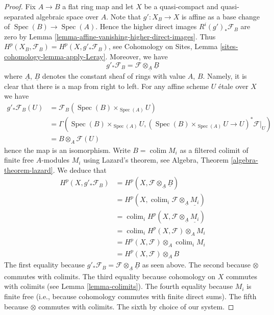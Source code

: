 \documentclass{stacks-project}
\theoremstyle{plain}
\theoremstyle{definition}
\theoremstyle{remark}
\numberwithin{equation}{subsection}
\def\colim{\mathop{\mathrm{colim}}\nolimits}
\def\Spec{\mathop{\mathrm{Spec}}}
\begin{document}
\begin{proof}
\medskip\noindent
Fix $A \to B$ a flat ring map and let $X$ be a quasi-compact and
quasi-separated algebraic space over $A$. Note that $g' : X_B \to X$
is affine as a base change of $\Spec(B) \to \Spec(A)$. Hence
the higher direct images $R^i(g')_*\mathcal{F}_B$ are zero by
Lemma \ref{lemma-affine-vanishing-higher-direct-images}.
Thus $H^p(X_B, \mathcal{F}_B) = H^p(X, g'_*\mathcal{F}_B)$, see
Cohomology on Sites, Lemma \ref{sites-cohomology-lemma-apply-Leray}.
Moreover, we have
$$
g'_*\mathcal{F}_B = \mathcal{F} \otimes_{\underline{A}} \underline{B}
$$
where $\underline{A}$, $\underline{B}$ denotes the constant sheaf of
rings with value $A$, $B$. Namely, it is clear that there is a map
from right to left. For any affine scheme $U$ \'etale over $X$ we have
\begin{align*}
g'_*\mathcal{F}_B(U) & = \mathcal{F}_B(\Spec(B) \times_{\Spec(A)} U) \\
& =
\Gamma(\Spec(B) \times_{\Spec(A)} U,
(\Spec(B) \times_{\Spec(A)} U \to U)^*\mathcal{F}|_U) \\
& =
B \otimes_A \mathcal{F}(U)
\end{align*}
hence the map is an isomorphism. Write $B = \colim M_i$ as a filtered
colimit of finite free $A$-modules $M_i$ using Lazard's theorem, see
Algebra, Theorem \ref{algebra-theorem-lazard}.
We deduce that
\begin{align*}
H^p(X, g'_*\mathcal{F}_B) &
= H^p(X, \mathcal{F} \otimes_{\underline{A}} \underline{B}) \\
& = H^p(X, \colim_i \mathcal{F} \otimes_{\underline{A}} \underline{M_i}) \\
& = \colim_i H^p(X, \mathcal{F} \otimes_{\underline{A}} \underline{M_i}) \\
& = \colim_i H^p(X, \mathcal{F}) \otimes_A M_i \\
& = H^p(X, \mathcal{F}) \otimes_A \colim_i M_i \\
& = H^p(X, \mathcal{F}) \otimes_A B
\end{align*}
The first equality because
$g'_*\mathcal{F}_B = \mathcal{F} \otimes_{\underline{A}} \underline{B}$
as seen above.
The second because $\otimes$ commutes with colimits.
The third equality because cohomology on $X$ commutes with
colimits (see
Lemma \ref{lemma-colimits}).
The fourth equality because $M_i$ is finite free (i.e., because cohomology
commutes with finite direct sums).
The fifth because $\otimes$ commutes with colimits.
The sixth by choice of our system.
\end{proof}
\end{document}
